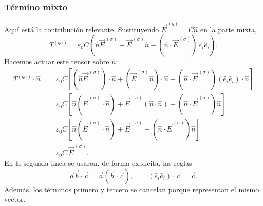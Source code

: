 \documentclass{article}
\numberwithin{equation}{section}
\newcommand{\Eself}{\vec E^{\,(q)}}
\newcommand{\Eext}{\vec E^{\,(\sigma)}}
\begin{document}
\subsubsection{Término mixto}

Aquí está la contribución relevante. Sustituyendo $\Eself=C\hat n$ en la parte mixta,
\begin{equation}
T^{(q\sigma)}=\varepsilon_0C\left(\hat n\Eext+\Eext\hat n-(\hat n\cdot\Eext)\,\hat e_i\hat e_i\right).
\end{equation}
Hacemos actuar este tensor sobre $\hat n$:
\begin{align}
T^{(q\sigma)}\cdot\hat n
&=\varepsilon_0C\left[(\hat n\Eext)\cdot\hat n+(\Eext\hat n)\cdot\hat n-(\hat n\cdot\Eext)(\hat e_i\hat e_i)\cdot\hat n\right]\\
&=\varepsilon_0C\left[\hat n(\Eext\cdot\hat n)+\Eext(\hat n\cdot\hat n)- (\hat n\cdot\Eext)\hat n\right]\\
&=\varepsilon_0C\left[\hat n(\Eext\cdot\hat n)+\Eext-(\hat n\cdot\Eext)\hat n\right]\\
&=\varepsilon_0C\,\Eext.
\end{align}
En la segunda línea se usaron, de forma explícita, las reglas
\begin{equation*}
\vec a\vec b\cdot\vec c=\vec a(\vec b\cdot\vec c),
\qquad
(\hat e_i\hat e_i)\cdot\vec c=\vec c.
\end{equation*}
Además, los términos primero y tercero se cancelan porque representan el mismo vector.

\begin{center}
\begingroup
\shorthandoff{<>}
\endgroup
\end{center}
\end{document}
